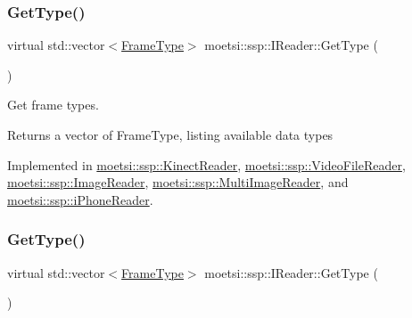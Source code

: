 \mbox{\label{classmoetsi_1_1ssp_1_1IReader_a4116c1931fde7bd66133934ffdca1cce}} 
\subsubsection{\texorpdfstring{Get\+Type()}{GetType()}\hspace{0.1cm}{\footnotesize\ttfamily [1/2]}}
{\footnotesize\ttfamily virtual std\+::vector$<$\hyperlink{namespacemoetsi_1_1ssp_a46efdfa2cd5a28ead465dcc8006b5a87}{Frame\+Type}$>$ moetsi\+::ssp\+::\+I\+Reader\+::\+Get\+Type (\begin{DoxyParamCaption}{ }\end{DoxyParamCaption})\hspace{0.3cm}{\ttfamily [pure virtual]}}



Get frame types. 

\begin{DoxyReturn}{Returns}
a vector of Frame\+Type, listing available data types 
\end{DoxyReturn}


Implemented in \hyperlink{classmoetsi_1_1ssp_1_1KinectReader_aef896aa686cbe1ea82dfc6aad46b6ff7}{moetsi\+::ssp\+::\+Kinect\+Reader}, \hyperlink{classmoetsi_1_1ssp_1_1VideoFileReader_a9d47af47299c5fccf766ac2d848a561b}{moetsi\+::ssp\+::\+Video\+File\+Reader}, \hyperlink{classmoetsi_1_1ssp_1_1ImageReader_af6f66957b6e3268c5336f4176c77fc73}{moetsi\+::ssp\+::\+Image\+Reader}, \hyperlink{classmoetsi_1_1ssp_1_1MultiImageReader_ad5f6cf0cfb1e64bcf569ab0bbfcce9d6}{moetsi\+::ssp\+::\+Multi\+Image\+Reader}, and \hyperlink{classmoetsi_1_1ssp_1_1iPhoneReader_a05d285ace85fc570bc2f453a0862ae56}{moetsi\+::ssp\+::i\+Phone\+Reader}.

\mbox{\label{classmoetsi_1_1ssp_1_1IReader_a4116c1931fde7bd66133934ffdca1cce}} 
\subsubsection{\texorpdfstring{Get\+Type()}{GetType()}\hspace{0.1cm}{\footnotesize\ttfamily [2/2]}}
{\footnotesize\ttfamily virtual std\+::vector$<$\hyperlink{namespacemoetsi_1_1ssp_a46efdfa2cd5a28ead465dcc8006b5a87}{Frame\+Type}$>$ moetsi\+::ssp\+::\+I\+Reader\+::\+Get\+Type (\begin{DoxyParamCaption}{ }\end{DoxyParamCaption})\hspace{0.3cm}{\ttfamily [pure virtual]}}



